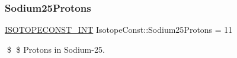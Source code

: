 \subsubsection{\texorpdfstring{Sodium25\+Protons}{Sodium25Protons}}
{\footnotesize\ttfamily \mbox{\hyperlink{group___isotope_const-_macros_ga5f18360b3e99483a35c32d789e62621c}{I\+S\+O\+T\+O\+P\+E\+C\+O\+N\+S\+T\+\_\+\+I\+NT}} Isotope\+Const\+::\+Sodium25\+Protons = 11}

\$ \$ Protons in Sodium-\/25. 